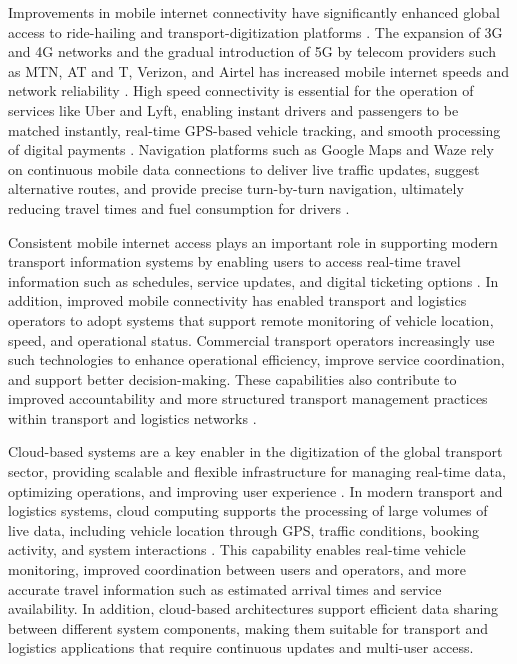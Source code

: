 Improvements in mobile internet connectivity have significantly enhanced global
access to ride-hailing and transport-digitization platforms
\cite{factmr_ride_hailing_2023}. The expansion of 3G and 4G networks and the
gradual introduction of 5G by telecom providers such as MTN, AT and T, Verizon,
and Airtel has increased mobile internet speeds and network reliability
\cite{IEEE}. High speed connectivity is essential for the operation of services
like Uber and Lyft, enabling instant drivers and passengers to be matched
instantly, real-time GPS-based vehicle tracking, and smooth processing of
digital payments \cite{apta2016shared_mobility}. Navigation platforms such as
Google Maps and Waze rely on continuous mobile data connections to deliver live
traffic updates, suggest alternative routes, and provide precise turn-by-turn
navigation, ultimately reducing travel times and fuel consumption for drivers
\cite{stopher2025_waze_revolutionizing_navigation} \cite{kan2018estimating}.


Consistent mobile internet access plays an important role in supporting modern
transport information systems by enabling users to access real-time travel
information such as schedules, service updates, and digital ticketing options
\cite{goto2002new_passenger_support_system} \cite{uitp2022_ticketing_maas}. In
addition, improved mobile connectivity has enabled transport and logistics
operators to adopt systems that support remote monitoring of vehicle location,
speed, and operational status. Commercial transport operators increasingly use
such technologies to enhance operational efficiency, improve service
coordination, and support better decision-making. These capabilities also
contribute to improved accountability and more structured transport management
practices within transport and logistics networks \cite{Ghosh_2025}
\cite{KURNIADI}.


Cloud-based systems are a key enabler in the digitization of the global
transport sector, providing scalable and flexible infrastructure for managing
real-time data, optimizing operations, and improving user experience
\cite{Modeshift_CloudTransit_2024}. In modern transport and logistics systems,
cloud computing supports the processing of large volumes of live data, including
vehicle location through GPS, traffic conditions, booking activity, and system
interactions \cite{Ridewyze_RideHailingCloud}. This capability enables real-time
vehicle monitoring, improved coordination between users and operators, and more
accurate travel information such as estimated arrival times and service
availability. In addition, cloud-based architectures support efficient data
sharing between different system components, making them suitable for transport
and logistics applications that require continuous updates and multi-user
access.


